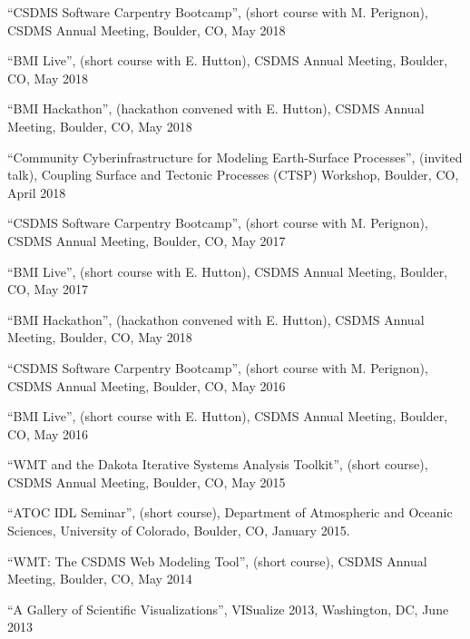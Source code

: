 \documentclass[letterpaper]{resume}
\begin{document}
\begin{enumerate}[{[}1{]}]

  \item ``CSDMS Software Carpentry Bootcamp'', (short course with
    M. Perignon), CSDMS Annual Meeting, Boulder, CO, May 2018

  \item ``BMI Live'', (short course with E. Hutton),
    CSDMS Annual Meeting, Boulder, CO, May 2018

  \item ``BMI Hackathon'', (hackathon convened with E. Hutton),
    CSDMS Annual Meeting, Boulder, CO, May 2018

  \item ``Community Cyberinfrastructure for Modeling Earth-Surface
    Processes'', (invited talk), Coupling Surface and Tectonic
    Processes (CTSP) Workshop, Boulder, CO, April 2018

  \item ``CSDMS Software Carpentry Bootcamp'', (short course with
    M. Perignon), CSDMS Annual Meeting, Boulder, CO, May 2017

  \item ``BMI Live'', (short course with E. Hutton),
    CSDMS Annual Meeting, Boulder, CO, May 2017

  \item ``BMI Hackathon'', (hackathon convened with E. Hutton),
    CSDMS Annual Meeting, Boulder, CO, May 2018

  \item ``CSDMS Software Carpentry Bootcamp'', (short course with
    M. Perignon), CSDMS Annual Meeting, Boulder, CO, May 2016

  \item ``BMI Live'', (short course with E. Hutton),
    CSDMS Annual Meeting, Boulder, CO, May 2016

  \item ``WMT and the Dakota Iterative Systems Analysis Toolkit'',
    (short course), CSDMS Annual Meeting, Boulder, CO, May 2015

  \item ``ATOC IDL Seminar'', (short course), Department of
    Atmospheric and Oceanic Sciences, University of Colorado, Boulder,
    CO, January 2015.

  \item ``WMT: The CSDMS Web Modeling Tool'', (short course), CSDMS
    Annual Meeting, Boulder, CO, May 2014

  \item ``A Gallery of Scientific Visualizations'', {VISualize} 2013,
    Washington, DC, June 2013


\end{enumerate}
\end{document}
